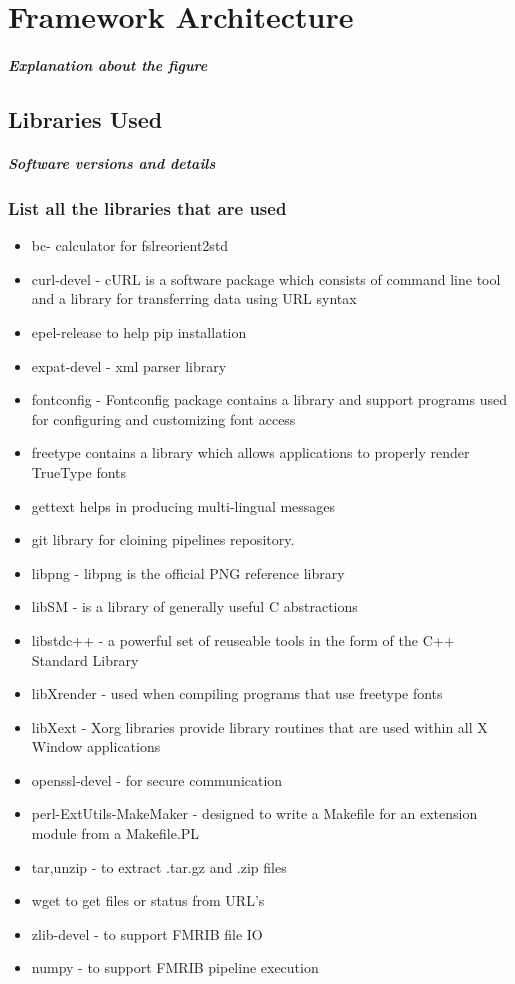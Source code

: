 \chapter{Framework Architecture}
\paragraph{Explanation about the figure}

\section{Libraries Used}
\paragraph{Software versions and details}
\subsection{List all the libraries that are used}
\begin{itemize}
 \item bc- calculator for fslreorient2std
 \item curl-devel - cURL is a software package which consists of command line tool and a library for transferring data using URL syntax
 \item epel-release to help pip installation
 \item expat-devel - xml parser library
 \item fontconfig - Fontconfig package contains a library and support programs used for configuring and customizing font access
 \item freetype contains a library which allows applications to properly render TrueType fonts
 \item gettext helps in producing multi-lingual messages
 \item git library for cloining pipelines repository.
 \item libpng - libpng is the official PNG reference library
 \item libSM - is a library of generally useful C abstractions
 \item libstdc++ - a powerful set of reuseable tools in the form of the C++ Standard Library
 \item libXrender - used when compiling programs that use freetype fonts
 \item libXext - Xorg libraries provide library routines that are used within all X Window applications
 \item openssl-devel - for secure communication
 \item perl-ExtUtils-MakeMaker - designed to write a Makefile for an extension module from a Makefile.PL
 \item tar,unzip - to extract .tar.gz and .zip files
 \item wget to get files or status from URL's
 \item zlib-devel - to support FMRIB file IO
 \item numpy - to support FMRIB pipeline execution
\end{itemize}

